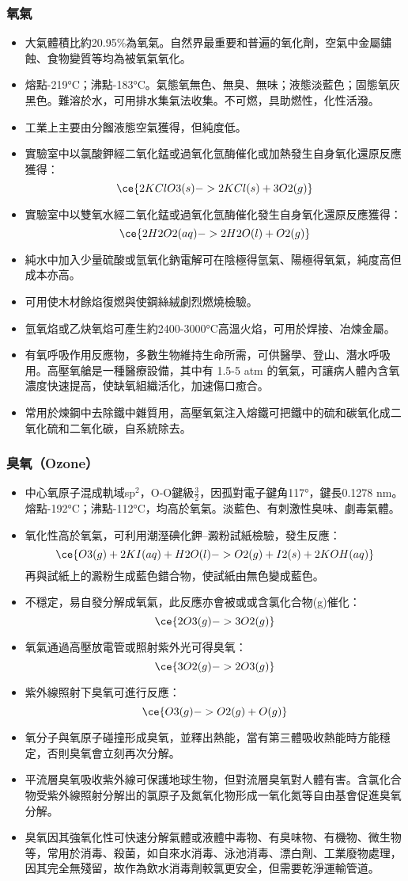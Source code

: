 \documentclass[a4paper,12pt]{report}
\begin{document}
\subsubsection{氧氣}
\begin{itemize}
\item 大氣體積比約20.95\%為氧氣。自然界最重要和普遍的氧化劑，空氣中金屬鏽蝕、食物變質等均為被氧氣氧化。
\item 熔點-219°C；沸點-183°C。氣態氧無色、無臭、無味；液態淡藍色；固態氧灰黑色。難溶於水，可用排水集氣法收集。不可燃，具助燃性，化性活潑。
\item 工業上主要由分餾液態空氣獲得，但純度低。
\item 實驗室中以氯酸鉀經二氧化錳或過氧化氫酶催化或加熱發生自身氧化還原反應獲得：
\[\ce{2KClO3(s) -> 2KCl(s) + 3O2(g)}\]
\item 實驗室中以雙氧水經二氧化錳或過氧化氫酶催化發生自身氧化還原反應獲得：
\[\ce{2H2O2(aq) -> 2H2O(l) + O2(g)}\]
\item 純水中加入少量硫酸或氫氧化鈉電解可在陰極得氫氣、陽極得氧氣，純度高但成本亦高。
\item 可用使木材餘焰復燃與使鋼絲絨劇烈燃燒檢驗。
\item 氫氧焰或乙炔氧焰可產生約2400-3000°C高溫火焰，可用於焊接、冶煉金屬。
\item 有氧呼吸作用反應物，多數生物維持生命所需，可供醫學、登山、潛水呼吸用。高壓氧艙是一種醫療設備，其中有 1.5-5 atm 的氧氣，可讓病人體內含氧濃度快速提高，使缺氧組織活化，加速傷口癒合。
\item 常用於煉鋼中去除鐵中雜質用，高壓氧氣注入熔鐵可把鐵中的硫和碳氧化成二氧化硫和二氧化碳，自系統除去。
\end{itemize}
\subsubsection{臭氧（Ozone）}
\begin{itemize}
\item 中心氧原子混成軌域sp$^2$，O-O鍵級$\frac{3}{2}$，因孤對電子鍵角117°，鍵長0.1278 nm。熔點-192°C；沸點-112°C，均高於氧氣。淡藍色、有刺激性臭味、劇毒氣體。
\item 氧化性高於氧氣，可利用潮溼碘化鉀–澱粉試紙檢驗，發生反應：
\[\ce{O3(g) + 2KI(aq) + H2O(l) -> O2(g) + I2(s) + 2KOH(aq)}\]
再與試紙上的澱粉生成藍色錯合物，使試紙由無色變成藍色。
\item 不穩定，易自發分解成氧氣，此反應亦會被或或含氯化合物(g)催化：
\[\ce{2O3(g) -> 3O2(g)}\]
\item 氧氣通過高壓放電管或照射紫外光可得臭氧：
\[\ce{3O2(g) -> 2O3(g)}\]
\item 紫外線照射下臭氧可進行反應：
\[\ce{O3(g) -> O2(g) + O(g)}\]
\item 氧分子與氧原子碰撞形成臭氧，並釋出熱能，當有第三體吸收熱能時方能穩定，否則臭氧會立刻再次分解。
\item 平流層臭氧吸收紫外線可保護地球生物，但對流層臭氧對人體有害。含氯化合物受紫外線照射分解出的氯原子及氮氧化物形成一氧化氮等自由基會促進臭氧分解。
\item 臭氧因其強氧化性可快速分解氣體或液體中毒物、有臭味物、有機物、微生物等，常用於消毒、殺菌，如自來水消毒、泳池消毒、漂白劑、工業廢物處理，因其完全無殘留，故作為飲水消毒劑較氯更安全，但需要乾淨運輸管道。
\end{itemize}
\end{document}
